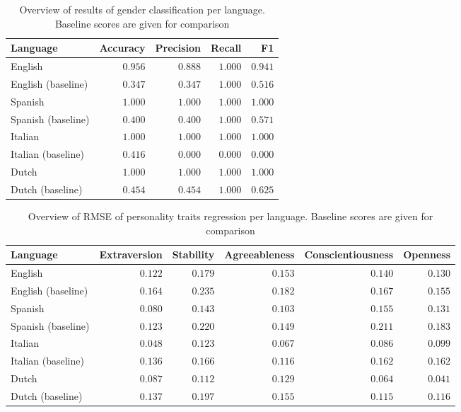 \documentclass[10pt, a4paper]{article}
\begin{document}
\begin{table*}
\caption{Overview of results of gender classification per language. Baseline scores are given for comparison}
\label{tab:scores-gender}
\begin{center}
\begin{tabular}{l|rrrr}
\toprule
Language & Accuracy & Precision & Recall & F1 \\
\midrule
English & $ 0.956 $ & $ 0.888 $ & $ 1.000 $ & $ 0.941 $ \\
English (baseline) & $ 0.347 $ & $ 0.347 $ & $ 1.000 $ & $ 0.516 $ \\
Spanish & $ 1.000 $ & $ 1.000 $ & $ 1.000 $ & $ 1.000 $ \\
Spanish (baseline) & $ 0.400 $ & $ 0.400 $ & $ 1.000 $ & $ 0.571 $ \\
Italian & $ 1.000 $ & $ 1.000 $ & $ 1.000 $ & $ 1.000 $ \\
Italian (baseline) & $ 0.416 $ & $ 0.000 $ & $ 0.000 $ & $ 0.000 $ \\
Dutch & $ 1.000 $ & $ 1.000 $ & $ 1.000 $ & $ 1.000 $ \\
Dutch (baseline) & $ 0.454 $ & $ 0.454 $ & $ 1.000 $ & $ 0.625 $ \\
\bottomrule
\end{tabular}
\end{center}
\end{table*}

\begin{table*}
\caption{Overview of RMSE of personality traits regression per language. Baseline scores are given for comparison}
\label{tab:scores-personality}
\begin{center}
\begin{tabular}{l|rrrrr}
\toprule
Language & Extraversion & Stability & Agreeableness & Conscient\-iousness & Openness \\
\midrule
English & $ 0.122 $ & $ 0.179 $ & $ 0.153 $ & $ 0.140 $ & $ 0.130 $ \\
English (baseline) & $ 0.164 $ & $ 0.235 $ & $ 0.182 $ & $ 0.167 $ & $ 0.155 $ \\
Spanish & $ 0.080 $ & $ 0.143 $ & $ 0.103 $ & $ 0.155 $ & $ 0.131 $ \\
Spanish (baseline) & $ 0.123 $ & $ 0.220 $ & $ 0.149 $ & $ 0.211 $ & $ 0.183 $ \\
Italian & $ 0.048 $ & $ 0.123 $ & $ 0.067 $ & $ 0.086 $ & $ 0.099 $ \\
Italian (baseline) & $ 0.136 $ & $ 0.166 $ & $ 0.116 $ & $ 0.162 $ & $ 0.162 $ \\
Dutch & $ 0.087 $ & $ 0.112 $ & $ 0.129 $ & $ 0.064 $ & $ 0.041 $ \\
Dutch (baseline) & $ 0.137 $ & $ 0.197 $ & $ 0.155 $ & $ 0.115 $ & $ 0.116 $ \\
\bottomrule
\end{tabular}
\end{center}
\end{table*}
\end{document}
